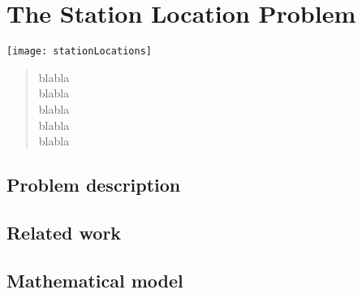 \chapter{The Station Location Problem} \label{chap:slp}
\begin{bibunit}[ieeetr]
\minitoc
\vspace{2cm}

\begin{minipage}[c]{0.45\linewidth}
\texttt{[image: stationLocations]}
\end{minipage}
\hfill
\begin{minipage}[c]{0.45\linewidth}
\begin{abstract}
blabla\\
blabla\\
blabla\\
blabla\\
blabla\\
\end{abstract}
\end{minipage}

\newpage
\section{Problem description}


\newpage
\section{Related work}


\newpage
\section{Mathematical model}


\newpage
{}
\renewcommand{\bibname}{Bibliography of chapter \thechapter}
\end{bibunit}